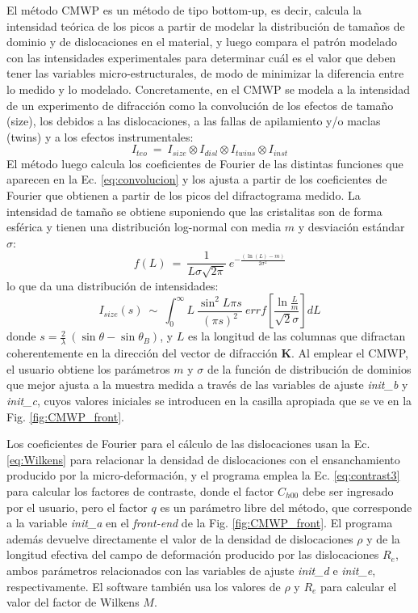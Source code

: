 El método CMWP es un método de tipo bottom-up, es decir, calcula la intensidad teórica de los picos a partir de modelar la distribución de tamaños de dominio y de dislocaciones en el material, y luego compara el patrón modelado con las intensidades experimentales para determinar cuál es el valor que deben tener las variables micro-estructurales, de modo de minimizar la diferencia entre lo medido y lo modelado.
Concretamente, en el CMWP se modela a la intensidad de un experimento de difracción como la convolución de los efectos de tamaño (size), los debidos a las dislocaciones, a las fallas de apilamiento y/o maclas (twins) y a los efectos instrumentales:
\begin{equation}
  I_{teo} \ = \ I_{size} \otimes I_{disl} \otimes I_{twins} \otimes I_{inst}
  \label{eq:convolucion}
\end{equation}
\noindent
El método luego calcula los coeficientes de Fourier de las distintas funciones que aparecen en la Ec. \ref{eq:convolucion} y los ajusta a partir de los coeficientes de Fourier que obtienen a partir de los picos del difractograma medido.
\newpage
La intensidad de tamaño se obtiene suponiendo que las cristalitas son de forma esférica y tienen una distribución log-normal con media $m$ y desviación estándar $\sigma$:
\begin{equation}
  f(L) \ = \ \frac{1}{L \sigma \sqrt{2 \pi}} \ e^{-\frac{(\ln(L)-m)}{2 \sigma^2}}
  \label{eq:lognormal}
\end{equation}
\noindent
lo que da una distribución de intensidades\cite{Ribarik2008}:
\begin{equation}
  I_{size}(s) \ \sim \ \int_0^{\infty} L \ \frac{\sin^2{L \pi s}}{(\pi s)^2} \ errf \left[ \frac{\ln{\frac{L}{m}}}{\sqrt{2}\sigma} \right] dL
  \label{eq:Isize}
\end{equation}
\noindent
donde $s = \frac{2}{\lambda} \ (\sin \theta - \sin \theta_B)$, y $L$ es la longitud de las columnas que difractan coherentemente en la dirección del vector de difracción $\mathbf{K}$.
Al emplear el CMWP, el usuario obtiene los parámetros $m$ y $\sigma$ de la función de distribución de dominios que mejor ajusta a la muestra medida a través de las variables de ajuste \textit{init\_b} y \textit{init\_c}, cuyos valores iniciales se introducen en la casilla apropiada que se ve en la Fig. \ref{fig:CMWP_front}.

Los coeficientes de Fourier para el cálculo de las dislocaciones usan la Ec. \ref{eq:Wilkens} para relacionar la densidad de dislocaciones con el ensanchamiento producido por la micro-deformación, y el programa emplea la Ec. \ref{eq:contrast3} para calcular los factores de contraste, donde el factor $C_{h00}$ debe ser ingresado por el usuario, pero el factor $q$ es un parámetro libre del método, que corresponde a la variable \textit{init\_a} en el \textit{front-end} de la Fig. \ref{fig:CMWP_front}.
El programa además devuelve directamente el valor de la densidad de dislocaciones $\rho$ y de la longitud efectiva del campo de deformación producido por las dislocaciones $R_e$, ambos parámetros relacionados con las variables de ajuste \textit{init\_d} e \textit{init\_e}, respectivamente. 
El software también usa los valores de $\rho$ y $R_e$ para calcular el valor del factor de Wilkens $M$.

